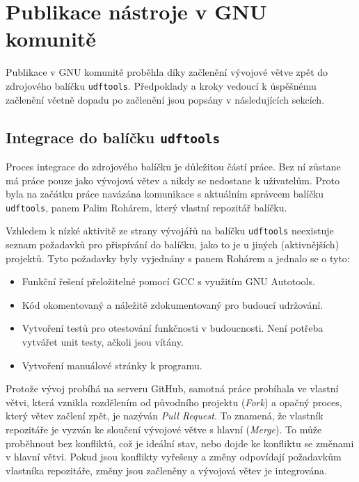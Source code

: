 
\chapter{Publikace nástroje v GNU komunitě}
\label{ch:publikace}
Publikace v GNU komunitě proběhla díky začlenění vývojové větve zpět do zdrojového balíčku \texttt{udftools}. Předpoklady a kroky vedoucí k úspěšnému začlenění včetně dopadu po začlenění jsou popsány v následujících sekcích.

\section{Integrace do balíčku \texttt{udftools}}
\label{sec:integrace}
Proces integrace do zdrojového balíčku je důležitou částí práce. Bez ní zůstane má práce pouze jako vývojová větev a nikdy se nedostane k uživatelům. Proto byla na začátku práce navázána komunikace s aktuálním správcem balíčku \texttt{udftools}, panem Palim Rohárem, který vlastní repozitář balíčku.

Vzhledem k nízké aktivitě ze strany vývojářů na balíčku \texttt{udftools} neexistuje seznam požadavků pro přispívání do balíčku, jako to je u jiných (aktivnějších) projektů. Tyto požadavky byly vyjednány s panem Rohárem a jednalo se o tyto:
\begin{itemize}
    \item Funkční řešení přeložitelné pomocí GCC s využitím GNU Autotools. 
    \item Kód okomentovaný a náležitě zdokumentovaný pro budoucí udržování.
    \item Vytvoření testů pro otestování funkčnosti v budoucnosti. Není potřeba vytvářet unit testy, ačkoli jsou vítány.
    \item Vytvoření manuálové stránky k programu.
\end{itemize}
Protože vývoj probíhá na serveru GitHub, samotná práce probíhala ve vlastní větvi, která vznikla rozdělením od původního projektu (\textit{Fork}) a opačný proces, který větev začlení zpět, je nazýván \textit{Pull Request}. To znamená, že vlastník repozitáře je vyzván ke sloučení vývojové větve s hlavní (\textit{Merge}). To může proběhnout bez konfliktů, což je ideální stav, nebo dojde ke konfliktu se změnami v hlavní větvi. Pokud jsou konflikty vyřešeny a změny odpovídají požadavkům vlastníka repozitáře, změny jsou začleněny a vývojová větev je integrována. 

